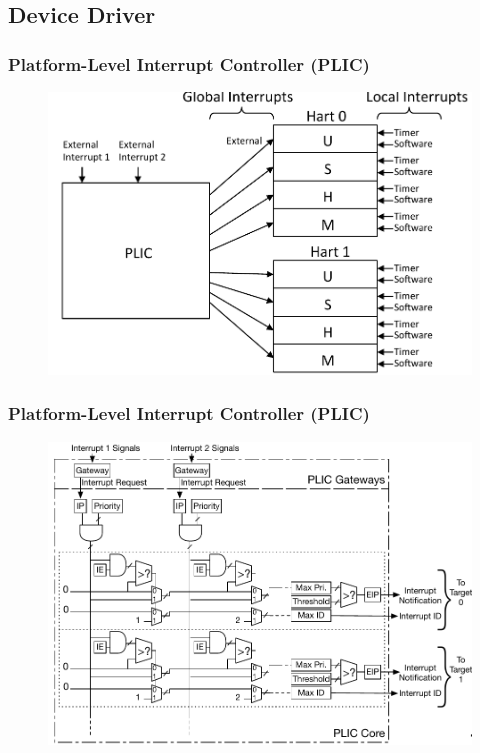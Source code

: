 \subsection{Device Driver} %
\begin{frame}[fragile]
    \frametitle{Platform-Level	 Interrupt	 Controller	 (PLIC)	 }
    \begin{figure}
    \includegraphics[width=0.7\linewidth]{figs/rv-plic.png}
    \end{figure}
\end{frame}

\begin{frame}[fragile]
    \frametitle{Platform-Level	 Interrupt	 Controller	 (PLIC)	 }
    \begin{figure}
        \includegraphics[width=0.6\linewidth]{figs/rv-plic-detail.png}
    \end{figure}
\end{frame}

